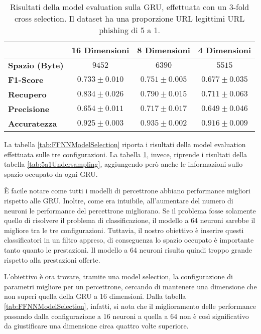 \documentclass[../../main.tex]{subfiles}
\begin{document}
    \begin{table}[H]
        \centering
        \begin{tabular}{lccc}
            \toprule
            {} &                      \textbf{16 Dimensioni} & \textbf{8 Dimensioni} & \textbf{4 Dimensioni} \\
            \midrule
            \textbf{Spazio (Byte)}  &      $9452$ & $6390$ & $5515$\\
            \midrule               
            \textbf{F1-Score }      &      $0.733 \pm 0.010$ & $0.751 \pm 0.005$ & $0.677 \pm 0.035$\\
            \textbf{Recupero   }    &      $0.834 \pm 0.026$ & $0.790 \pm 0.015$ & $0.711 \pm 0.063$\\
            \textbf{Precisione}     &      $0.654 \pm 0.011$ & $0.717 \pm 0.017$ & $0.649 \pm 0.046$\\
            \textbf{Accuratezza }   &      $0.925 \pm 0.003$ & $0.935 \pm 0.002$ & $0.916 \pm 0.009$\\
            \bottomrule
        \end{tabular}
        \caption{Risultati della model evaluation sulla GRU, effettuata con un 3-fold cross selection. Il dataset ha una proporzione URL legittimi URL phishing di 5 a 1.}
        \label{tab:GRUModelSelection}
    \end{table}

    La tabella \ref{tab:FFNNModelSelection} riporta i risultati della model evaluation effettuata sulle tre configurazioni. La tabella \ref{tab:GRUModelSelection}, invece, riprende i risultati della tabella \ref{tab:5a1Undersampling}, aggiungendo però anche le informazioni sullo spazio occupato da ogni GRU.

    È facile notare come tutti i modelli di percettrone abbiano performance migliori rispetto alle GRU. Inoltre, come era intuibile, all'aumentare del numero di neuroni le performance del percettrone migliorano. Se il problema fosse solamente quello di risolvere il problema di classificazione, il modello a 64 neuroni sarebbe il migliore tra le tre configurazioni. Tuttavia, il nostro obiettivo è inserire questi classificatori in un filtro appreso, di conseguenza lo spazio occupato è importante tanto quanto le prestazioni. Il modello a 64 neuroni risulta quindi troppo grande rispetto alla prestazioni offerte.
    
    L'obiettivo è ora trovare, tramite una model selection, la configurazione di parametri migliore per un percettrone, cercando di mantenere una dimensione che non superi quella della GRU a 16 dimensioni. Dalla tabella \ref{tab:FFNNModelSelection}, infatti, si nota che il miglioramento delle performance passando dalla configurazione a 16 neuroni a quella a 64 non è così significativo da giustificare una dimensione circa quattro volte superiore.
\end{document}
